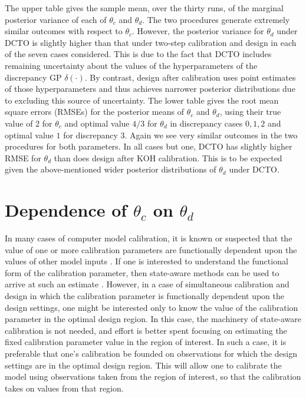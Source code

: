 \documentclass[12pt]{article}
\begin{document}
%
The upper table gives the sample mean, over the thirty runs, of the marginal posterior variance of each of $\theta_c$ and $\theta_d$.
%
The two procedures generate extremely similar outcomes with respect to $\theta_c$.
%
However, the posterior variance for $\theta_d$ under DCTO is slightly higher than that under two-step calibration and design in each of the seven cases considered.
%
This is due to the fact that DCTO includes remaining uncertainty about the values of the hyperparameters of the discrepancy GP $\delta(\cdot)$.
%
By contrast, design after calibration uses point estimates of those hyperparameters and thus achieves narrower posterior distributions due to excluding this source of uncertainty.
%
The lower table gives the root mean square errors (RMSEs) for the posterior means of $\theta_c$ and $\theta_d$, using their true value of 2 for $\theta_c$ and optimal value $4/3$ for $\theta_d$ in discrepancy cases $0,1,2$ and optimal value $1$ for discrepancy 3.
%
Again we see very similar outcomes in the two procedures for both parameters.
%
In all cases but one, DCTO has slightly higher RMSE for $\theta_d$ than does design after KOH calibration.
%
This is to be expected given the above-mentioned wider posterior distributions of $\theta_d$ under DCTO.
%

%
\section{Dependence of $\theta_c$ on $\theta_d$}\label{sec:as}
%
In many cases of computer model calibration, it is known or suspected that the value of one or more calibration parameters are functionally dependent upon the values of other model inputs \citep{Atamturktur2015,Atamturktur2017,Ezzat2018}.
%
If one is interested to understand the functional form of the calibration parameter, then state-aware methods can be used to arrive at such an estimate \citep{Atamturktur2015,Atamturktur2017,Brown2018}.
%
However, in a case of simultaneous calibration and design in which the calibration parameter is functionally dependent upon the design settings, one might be interested only to know the value of the calibration parameter in the optimal design region.
%
In this case, the machinery of state-aware calibration is not needed, and effort is better spent focusing on estimating the fixed calibration parameter value in the region of interest.
%
In such a case, it is preferable that one's calibration be founded on observations for which the design settings are in the optimal design region.
%
This will allow one to calibrate the model using observations taken from the region of interest, so that the calibration takes on values from that region.
%
\end{document}
